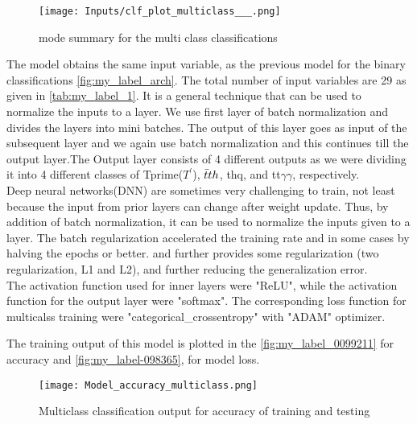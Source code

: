 \begin{wrapfigure}{l}{0.5\textwidth}
\centering
\texttt{[image: Inputs/clf\_plot\_multiclass\_\_\_.png]}
\caption{mode summary for the multi class classifications}
\label{fig:multicalss}
\end{wrapfigure}
The model obtains the same input variable, as the previous model for the binary classifications \autoref{fig:my_label_arch}. The  total number of input variables are 29 as given in \autoref{tab:my_label_1}. It is a general technique that can be used to normalize the inputs to a layer. We use first layer of batch normalization and divides the layers into mini batches. The output of this layer goes as input of the subsequent layer and we again use batch normalization and this continues till the output layer.The Output layer consists of 4 different outputs as we were dividing it into 4 different classes of Tprime($T^'$), $\Bar{t}th$, thq, and tt$\gamma \gamma$, respectively. \\
Deep neural networks(DNN) are sometimes very challenging to train, not least because the input from prior layers can change after weight update. Thus, by addition of batch normalization, it can be used to normalize the inputs given to a layer. The batch regularization accelerated the training rate and in some cases by halving the epochs or better. and further provides some regularization (two regularization, L1 and L2), and further reducing the generalization error.\\
The activation function used for inner layers were "ReLU", while the activation function for the output layer were "softmax". The corresponding loss function for multicalss training were "categorical\_crossentropy" with "ADAM" optimizer.

The training output of this model is plotted in the \autoref{fig:my_label_0099211} for accuracy and \autoref{fig:my_label-098365}, for model loss.




\begin{figure}[H]
    \centering
    \texttt{[image: Model\_accuracy\_multiclass.png]}
    \caption{Multiclass classification output for accuracy of training and testing}
    \label{fig:my_label_0099211}
\end{figure}


